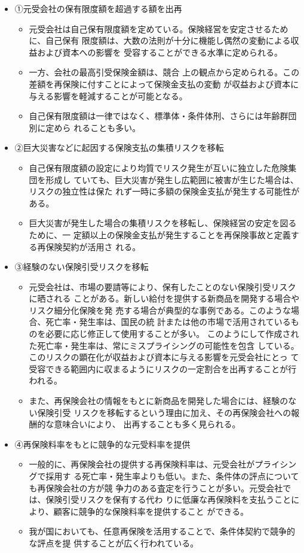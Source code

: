 \documentclass[report,gutter=10mm,fore-edge=10mm,uplatex,dvipdfmx]{jlreq}
\begin{document}
\begin{itemize}
\item[]
 ①元受会社の保有限度額を超過する額を出再
\begin{itemize}
\item[]  元受会社は自己保有限度額を定めている。保険経営を安定させるために、自己保有
 限度額は、大数の法則が十分に機能し偶然の変動による収益および資本への影響を
 受容することができる水準に定められる。
\item[]
 一方、会社の最高引受保険金額は、競合
 上の観点から定められる。この差額を再保険に付すことによって保険金支払の変動
 が収益および資本に与える影響を軽減することが可能となる。
\item[]
 自己保有限度額は一律ではなく、標準体・条件体刑、さらには年齢群団別に定めら
 れることも多い。
\end{itemize}
\item[]
 ②巨大災害などに起因する保険支払の集積リスクを移転
\begin{itemize}
\item[]
 自己保有限度額の設定により均質でリスク発生が互いに独立した危険集団を形成し
 ていても、巨大災害が発生し広範囲に被害が生じた場合は、リスクの独立性は保た
 れず一時に多額の保険金支払が発生する可能性がある。
\item[]
 巨大災害が発生した場合の集積リスクを移転し、保険経営の安定を図るために、一
 定額以上の保険金支払が発生することを再保険事故と定義する再保険契約が活用さ
 れる。
\end{itemize}
\item[]
 ③経験のない保険引受リスクを移転
\begin{itemize}
\item[]
 元受会社は、市場の要請等により、保有したことのない保険引受リスクに晒される
 ことがある。新しい給付を提供する新商品を開発する場合やリスク細分化保険を発
 売する場合が典型的な事例である。このような場合、死亡率・発生率は、国民の統
 計または他の市場で活用されているものを必要に応じ修正して使用することが多い。
 このようにして作成された死亡率・発生率は、常にミスプライシングの可能性を包含
 している。このリスクの顕在化が収益および資本に与える影響を元受会社にとっ
 て受容できる範囲内に収まるようにリスクの一定割合を出再することが行われる。
\item[]
 また、再保険会社の情報をもとに新商品を開発した場合には、経験のない保険引受
 リスクを移転するという理由に加え、その再保険会社への報酬的な意味合いにより、
 出再することも多く見られる。
\end{itemize}
\item[]
 ④再保険料率をもとに競争的な元受料率を提供
\begin{itemize}
\item[]
一般的に、再保険会社の提供する再保険料率は、元受会社がプライシングで採用す
 る死亡率・発生率よりも低い。また、条件体の評点についても再保険会社の方が競
 争力のある査定を行うことが多い。元受会社では、保険引受リスクを保有する代わ
 りに低廉な再保険料を支払うことにより、顧客に競争的な保険料率を提供すること
 ができる。
\item[]
 我が国においても、任意再保険を活用することで、条件体契約で競争的な評点を提
 供することが広く行われている。
\end{itemize}
\end{itemize}
\end{document}

